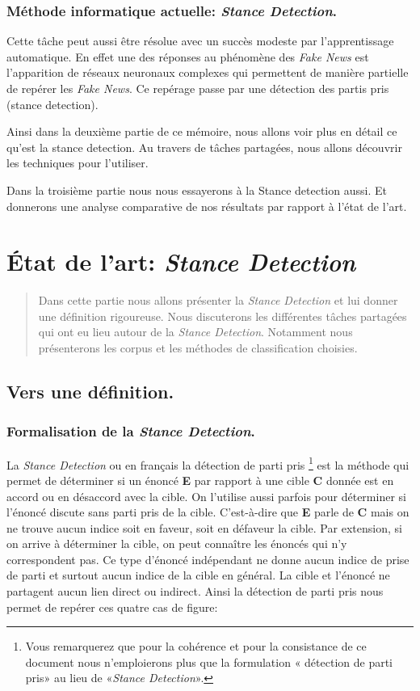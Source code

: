 \documentclass[11pt,a4paper,oldfontcommands]{memoir}
\begin{document}
\subsection{Méthode informatique actuelle: \textit{Stance Detection}.}
Cette tâche peut aussi être résolue avec un succès modeste par l'apprentissage automatique.
En effet une des réponses au phénomène des \textit{Fake News} est l'apparition de réseaux neuronaux complexes qui permettent de manière partielle de repérer les \textit{Fake News}. Ce repérage passe par une détection des partis pris (stance detection).

Ainsi dans la deuxième partie de ce mémoire, nous allons voir plus en détail ce qu'est la stance detection.
Au travers de tâches partagées, nous allons découvrir les techniques pour l'utiliser.

Dans la troisième partie nous nous essayerons à la Stance detection aussi.
Et donnerons une analyse comparative de nos résultats par rapport à l'état de l'art.


\chapter{État de l'art: \textit{Stance Detection}}

\begin{abstract}
 Dans cette partie nous allons présenter la \textit{Stance Detection} et lui donner une définition rigoureuse.
 Nous discuterons les différentes tâches partagées qui ont eu lieu autour de la \textit{Stance Detection}. Notamment nous présenterons les corpus et les méthodes de classification choisies.
\end{abstract}

\section{Vers une définition.}
\subsection{Formalisation de la \textit{Stance Detection}.}
La \textit{Stance Detection} ou en français la détection de parti pris
\footnote{Vous remarquerez que pour la cohérence et pour la consistance de ce document nous  n'emploierons plus que la formulation « détection de parti pris» au lieu de «\textit{Stance Detection}».}
est la méthode qui permet de déterminer si un énoncé \textbf{E} par rapport à une cible \textbf{C} donnée est en accord ou en désaccord avec la cible.
On l'utilise aussi parfois pour déterminer si l'énoncé discute sans parti pris de la cible.
C'est-à-dire que \textbf{E} parle de \textbf{C} mais on ne trouve aucun indice soit en faveur, soit en défaveur la cible.
Par extension, si on arrive à déterminer la cible, on peut connaître les énoncés qui n'y correspondent pas.
Ce type d'énoncé indépendant ne donne aucun indice de prise de parti et surtout aucun indice de la cible en général.
La cible et l'énoncé ne partagent aucun lien direct ou indirect.
Ainsi la détection de parti pris nous permet de repérer ces quatre cas de figure:
\end{document}
